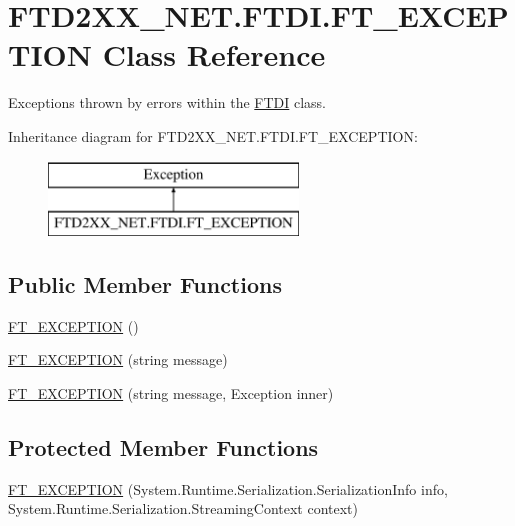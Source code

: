 \hypertarget{class_f_t_d2_x_x___n_e_t_1_1_f_t_d_i_1_1_f_t___e_x_c_e_p_t_i_o_n}{}\section{F\+T\+D2\+X\+X\+\_\+\+N\+E\+T.\+F\+T\+D\+I.\+F\+T\+\_\+\+E\+X\+C\+E\+P\+T\+I\+ON Class Reference}
\label{class_f_t_d2_x_x___n_e_t_1_1_f_t_d_i_1_1_f_t___e_x_c_e_p_t_i_o_n}


Exceptions thrown by errors within the \mbox{\hyperlink{class_f_t_d2_x_x___n_e_t_1_1_f_t_d_i}{F\+T\+DI}} class.  


Inheritance diagram for F\+T\+D2\+X\+X\+\_\+\+N\+E\+T.\+F\+T\+D\+I.\+F\+T\+\_\+\+E\+X\+C\+E\+P\+T\+I\+ON\+:\begin{figure}[H]
\begin{center}
\leavevmode
\includegraphics[height=2.000000cm]{class_f_t_d2_x_x___n_e_t_1_1_f_t_d_i_1_1_f_t___e_x_c_e_p_t_i_o_n}
\end{center}
\end{figure}
\subsection*{Public Member Functions}
\begin{DoxyCompactItemize}
\item 
\mbox{\hyperlink{class_f_t_d2_x_x___n_e_t_1_1_f_t_d_i_1_1_f_t___e_x_c_e_p_t_i_o_n_a626f4ba456aeb6bdec3ecd4bf6b85323}{F\+T\+\_\+\+E\+X\+C\+E\+P\+T\+I\+ON}} ()
\item 
\mbox{\hyperlink{class_f_t_d2_x_x___n_e_t_1_1_f_t_d_i_1_1_f_t___e_x_c_e_p_t_i_o_n_a2c79d4dc638ad536c42f0c1aa53acc1d}{F\+T\+\_\+\+E\+X\+C\+E\+P\+T\+I\+ON}} (string message)
\item 
\mbox{\hyperlink{class_f_t_d2_x_x___n_e_t_1_1_f_t_d_i_1_1_f_t___e_x_c_e_p_t_i_o_n_af96716378394183329c7f71eae5ad76b}{F\+T\+\_\+\+E\+X\+C\+E\+P\+T\+I\+ON}} (string message, Exception inner)
\end{DoxyCompactItemize}
\subsection*{Protected Member Functions}
\begin{DoxyCompactItemize}
\item 
\mbox{\hyperlink{class_f_t_d2_x_x___n_e_t_1_1_f_t_d_i_1_1_f_t___e_x_c_e_p_t_i_o_n_a8e5efcbe020c7107903f8555fb3a5c0a}{F\+T\+\_\+\+E\+X\+C\+E\+P\+T\+I\+ON}} (System.\+Runtime.\+Serialization.\+Serialization\+Info info, System.\+Runtime.\+Serialization.\+Streaming\+Context context)
\end{DoxyCompactItemize}


